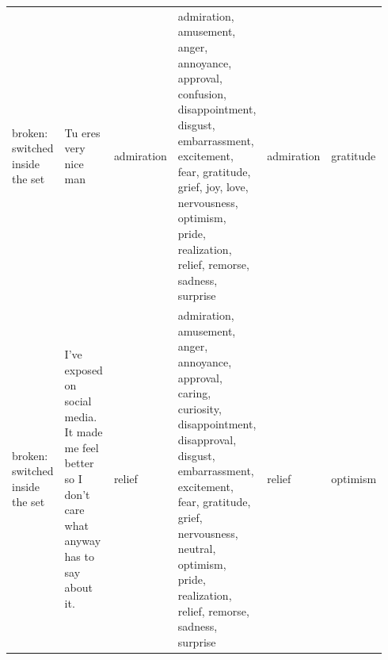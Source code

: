 \begin{tabular}{p{0.14\linewidth}p{0.36\linewidth}p{0.08\linewidth}p{0.2\linewidth}p{0.08\linewidth}p{0.08\linewidth}}
broken: switched inside the set & Tu eres very nice man & admiration & admiration, amusement, anger, annoyance, approval, confusion, disappointment, disgust, embarrassment, excitement, fear, gratitude, grief, joy, love, nervousness, optimism, pride, realization, relief, remorse, sadness, surprise & admiration & gratitude \\
broken: switched inside the set & I’ve exposed on social media. It made me feel better so I don’t care what anyway has to say about it. & relief & admiration, amusement, anger, annoyance, approval, caring, curiosity, disappointment, disapproval, disgust, embarrassment, excitement, fear, gratitude, grief, nervousness, neutral, optimism, pride, realization, relief, remorse, sadness, surprise & relief & optimism \\
\bottomrule
\end{tabular}
